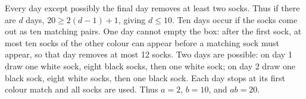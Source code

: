 Every day except possibly the final day removes at least two socks. Thus if there are $d$ days, $20\ge2(d-1)+1$, giving $d\le10$. Ten days occur if the socks come out as ten matching pairs. One day cannot empty the box: after the first sock, at most ten socks of the other colour can appear before a matching sock must appear, so that day removes at most 12 socks. Two days are possible: on day 1 draw one white sock, eight black socks, then one white sock; on day 2 draw one black sock, eight white socks, then one black sock. Each day stops at its first colour match and all socks are used. Thus $a=2$, $b=10$, and $\boxed{ab=20}$.
